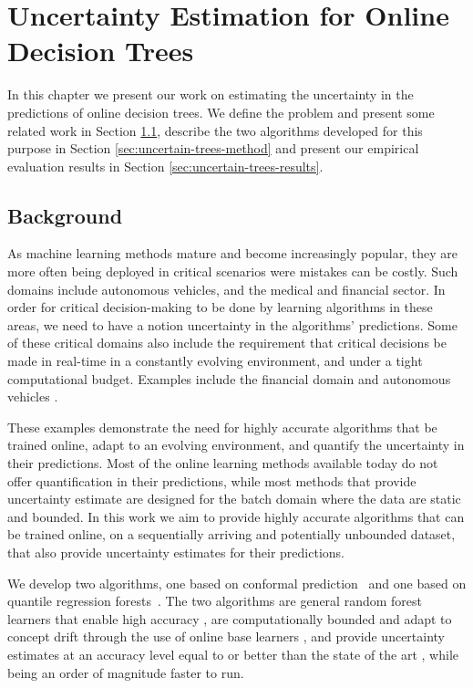 \chapter{Uncertainty Estimation for Online Decision Trees}

In this chapter we present our work on estimating the uncertainty
in the predictions of online decision trees. We define the problem
and present some related work in Section \ref{sec:uncertain-trees-background},
describe the two algorithms developed for this purpose in Section
\ref{sec:uncertain-trees-method} and present our empirical evaluation
results in Section \ref{sec:uncertain-trees-results}.

\section{Background}
\label{sec:uncertain-trees-background}

As machine learning methods mature and become increasingly popular, they are more
often being deployed in critical scenarios were mistakes can be costly. Such
domains include autonomous vehicles, and the medical and financial sector.
In order for critical decision-making to be done by learning algorithms in these areas, we need
to have a notion uncertainty in the algorithms' predictions.
Some of these critical domains also include the requirement that critical decisions
be made in real-time in a constantly evolving environment, and under a tight computational budget. Examples include the financial domain \cite{streaming-finance} and autonomous vehicles \cite{av-safety}.

These examples demonstrate the need for highly accurate algorithms that be trained
online, adapt to an evolving environment, and quantify the uncertainty in their
predictions. Most of the online learning methods available today do not offer
quantification in their predictions, while most methods that provide uncertainty
estimate are designed for the batch domain where the data are static and bounded.
In this work we aim to provide highly accurate algorithms that can be trained
online, on a sequentially arriving and potentially unbounded dataset, that also
provide uncertainty estimates for their predictions.

We develop two algorithms, one based on conformal prediction~\cite{vovk2005algorithmic} and one based on quantile
regression forests~\cite{meinshausen2006quantile}. The two algorithms are general random forest learners that
enable high accuracy \cite{hundreds-classifiers}, are computationally bounded
and adapt to concept drift through the use of online base learners \cite{fimt},
and provide uncertainty estimates at an accuracy level equal to or better
than the state of the art \cite{mondrian-forests-original}, while being an order of magnitude faster to run.

